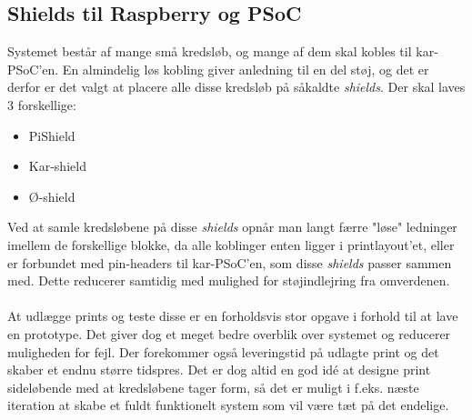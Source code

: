 \subsection{Shields til Raspberry og PSoC}

Systemet består af mange små kredsløb, og mange af dem skal kobles til kar-PSoC'en. En almindelig løs kobling giver anledning til en del støj, og det er derfor er det valgt at placere alle disse kredsløb på såkaldte \emph{shields}. Der skal laves 3 forskellige:

\begin{itemize}
\item PiShield
\item Kar-shield
\item Ø-shield
\end{itemize}

Ved at samle kredsløbene på disse \emph{shields} opnår man langt færre "løse" ledninger imellem de forskellige blokke, da alle koblinger enten ligger i printlayout'et, eller er forbundet med pin-headers til kar-PSoC'en, som disse \emph{shields} passer sammen med. Dette reducerer samtidig med mulighed for støjindlejring fra omverdenen.
\\\\
At udlægge prints og teste disse er en forholdsvis stor opgave i forhold til at lave en prototype. Det giver dog et meget bedre overblik over systemet og reducerer muligheden for fejl. Der forekommer også leveringstid på udlagte print og det skaber et endnu større tidspres. Det er dog altid en god idé at designe print sideløbende med at kredsløbene tager form, så det er muligt i f.eks. næste iteration at skabe et fuldt funktionelt system som vil være tæt på det endelige.